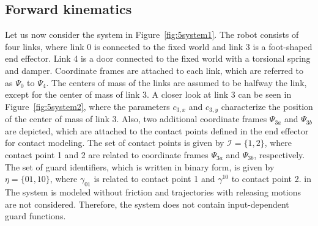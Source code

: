 \documentclass[../DC2019003Bouma.tex]{subfiles}
\begin{document}
\subsection{Forward kinematics}\label{sec:5kin}
Let us now consider the system in Figure~\ref{fig:5system1}. The robot consists of four links, where link 0 is connected to the fixed world and link 3 is a foot-shaped end effector. Link 4 is a door connected to the fixed world with a torsional spring and damper. Coordinate frames are attached to each link, which are referred to as $\Psi_0$ to $\Psi_4$. The centers of mass of the links are assumed to be halfway the link, except for the center of mass of link 3. A closer look at link 3 can be seen in Figure~\ref{fig:5system2}, where the parameters $c_{3,x}$ and $c_{3,y}$ characterize the position of the center of mass of link 3. Also, two additional coordinate frames $\Psi_{3a}$ and $\Psi_{3b}$ are depicted, which are attached to the contact points defined in the end effector for contact modeling. The set of contact points is given by $\mathcal{I} = \{1,2\}$, where contact point 1 and 2 are related to coordinate frames $\Psi_{3a}$ and $\Psi_{3b}$, respectively. The set of guard identifiers, which is written in binary form, is given by $\eta = \{01,10\}$, where $\gamma_{01}$ is related to contact point 1 and $\gamma^{10}$ to contact point 2. in The system is modeled without friction and trajectories with releasing motions are not considered. Therefore, the system does not contain input-dependent guard functions.
\end{document}
